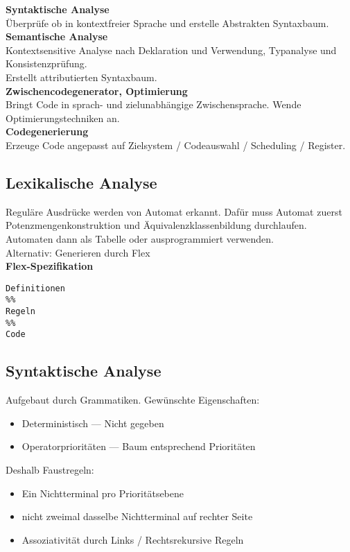 \textbf{Syntaktische Analyse}\\
Überprüfe ob in kontextfreier Sprache und erstelle Abstrakten Syntaxbaum.\\

\textbf{Semantische Analyse}\\
Kontextsensitive Analyse nach Deklaration und Verwendung, Typanalyse und Konsistenzprüfung.\\
Erstellt attributierten Syntaxbaum.\\

\textbf{Zwischencodegenerator, Optimierung}\\
Bringt Code in sprach- und zielunabhängige Zwischensprache. Wende Optimierungstechniken an.\\

\textbf{Codegenerierung}\\
Erzeuge Code angepasst auf Zielsystem / Codeauswahl / Scheduling / Register.

\subsection{Lexikalische Analyse}%
\label{cmp:sub:lexikalische-analyse}
Reguläre Ausdrücke werden von Automat erkannt. Dafür muss Automat zuerst Potenzmengenkonstruktion und
Äquivalenzklassenbildung durchlaufen.\\
Automaten dann als Tabelle oder ausprogrammiert verwenden.\\
Alternativ: Generieren durch Flex\\

\textbf{Flex-Spezifikation}
\begin{lstlisting}
Definitionen
%%
Regeln
%%
Code
\end{lstlisting}

\subsection{Syntaktische Analyse}%
\label{cmp:sub:syntaktische-analyse}
Aufgebaut durch Grammatiken. Gewünschte Eigenschaften:
\begin{itemize}
  \item Deterministisch --- Nicht gegeben
  \item Operatorprioritäten --- Baum entsprechend Prioritäten
\end{itemize}
Deshalb Faustregeln:
\begin{itemize}
  \item Ein Nichtterminal pro Prioritätsebene
  \item nicht zweimal dasselbe Nichtterminal auf rechter Seite
  \item Assoziativität durch Links / Rechtsrekursive Regeln
\end{itemize}

